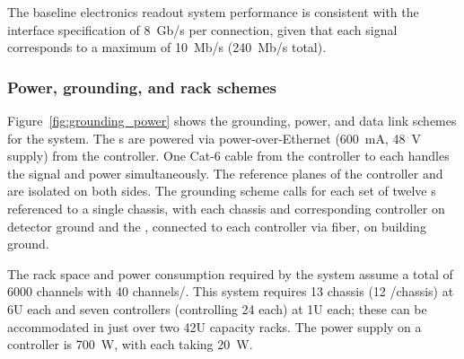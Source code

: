 The baseline electronics readout system performance is consistent with the  interface specification of \SI{8}{Gb/s} per connection, given that
each  signal corresponds to a maximum of \SI{10}{Mb/s} (\SI{240}{Mb/s} total).  



\subsubsection{Power, grounding, and rack schemes} 

Figure~\ref{fig:grounding_power} shows the grounding, power, and data link schemes for the system. The s are powered via power-over-Ethernet (\SI{600}{mA}, \SI{48}{V} supply) from the controller. One Cat-6 cable from the controller to each  handles the signal and power simultaneously. The reference planes of the controller and  are isolated on both sides. The grounding scheme calls for each set of twelve s referenced to a single chassis, with each chassis and corresponding controller on detector ground and the , connected to each controller via fiber, on building ground. 
 
The rack space and power consumption required by the system assume
a total of 6000 channels with 40 channels/. This system requires 13 chassis (12 /chassis) at 6U each and seven controllers (controlling 24  each) at 1U each; these can be accommodated in just over two 42U capacity racks. The power supply on a controller is \SI{700}{W}, with each  taking \SI{20}{W}. 
 

